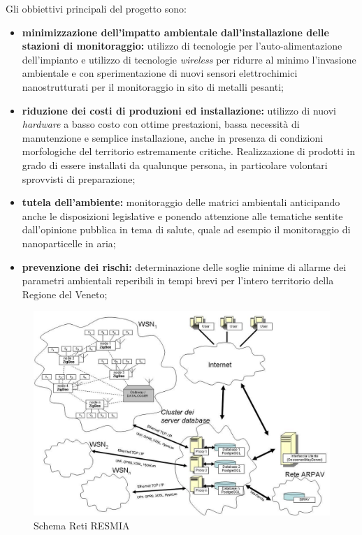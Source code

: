 Gli obbiettivi principali del progetto sono:
\begin{itemize}

	\item \textbf{minimizzazione dell'impatto ambientale dall'installazione delle stazioni di monitoraggio:} utilizzo di tecnologie per l'auto-alimentazione dell'impianto e utilizzo di tecnologie \textit{wireless} per ridurre al minimo l'invasione ambientale e con sperimentazione di nuovi sensori elettrochimici nanostrutturati per il monitoraggio in sito di metalli pesanti;
	\item \textbf{riduzione dei costi di produzioni ed installazione:} utilizzo di nuovi \textit{hardware} a basso costo con ottime prestazioni, bassa necessità di manutenzione e semplice installazione, anche in presenza di condizioni morfologiche del territorio estremamente critiche. Realizzazione di prodotti in grado di essere installati da qualunque persona, in particolare volontari sprovvisti di preparazione;
	\item \textbf{tutela dell'ambiente:} monitoraggio delle matrici ambientali anticipando anche le disposizioni legislative e ponendo attenzione alle tematiche sentite dall'opinione pubblica in tema di salute, quale ad esempio il monitoraggio di nanoparticelle in aria;
	\item \textbf{prevenzione dei rischi:} determinazione delle soglie minime di allarme dei parametri ambientali reperibili in tempi brevi per l'intero territorio della Regione del Veneto;

\end{itemize}

\begin{figure}[htbp]
\centering
\includegraphics[scale=0.3]{./capitoli/capitolo1/img/retiresmia}
\caption{Schema Reti RESMIA}
\end{figure}

